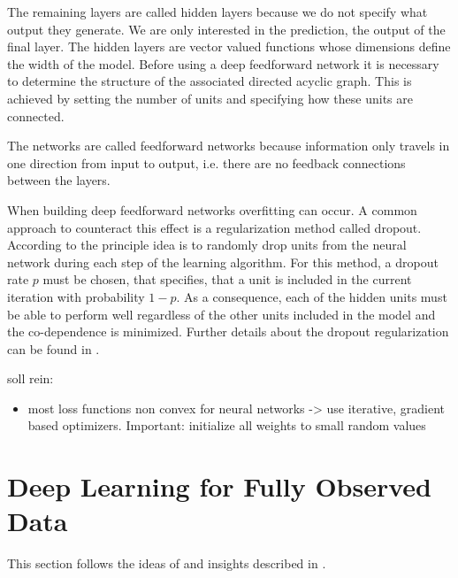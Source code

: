 \documentclass[12pt, a4paper]{article}
\theoremstyle{definition}
\theoremstyle{plain}
\numberwithin{equation}{section}
\numberwithin{figure}{section}
\numberwithin{table}{section}
\begin{document}
	The remaining layers are called hidden layers because we do not specify what output they generate.
	We are only interested in the prediction, the output of the final layer.
	The hidden layers are vector valued functions whose dimensions define the width of the model.
	Before using a deep feedforward network it is necessary to determine the structure of the associated directed acyclic graph.
	This is achieved by setting the number of units and specifying how these units are connected.
	
	The networks are called feedforward networks because information only travels in one direction from input to output, i.e. there are no feedback connections between the layers.
	
	
	
	When building deep feedforward networks overfitting can occur.
	A common approach to counteract this effect is a regularization method called dropout.
	According to \citet*{dropout} the principle idea is to randomly drop units from the neural network during each step of the learning algorithm.
	For this method, a dropout rate $p$ must be chosen, that specifies, that a unit is included in the current iteration with probability $1-p$.
	As a consequence, each of the hidden units must be able to perform well regardless of the other units included in the model and the co-dependence is minimized.
	Further details about the dropout regularization can be found in \citet*{dropout}.
	
	
	soll rein:
	\begin{itemize}
		\item most loss functions non convex for neural networks -> use iterative, gradient based optimizers. Important: initialize all weights to small random values
	\end{itemize}
	
	
	
	\newpage
	
	\section{Deep Learning for Fully Observed Data} \label{uncensored}
	This section follows the ideas of \citet*{basearticle} and insights described in \citet*{deeplbook}.
	
\end{document}
